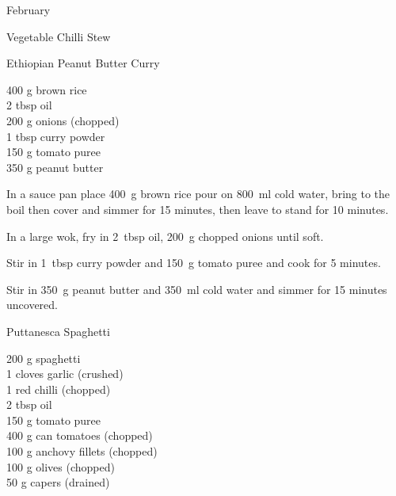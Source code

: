 \begin{menu}{February}
\begin{recipe}{2}{Vegetable Chilli Stew}
\begin{instructions}
    \end{instructions}
    \end{recipe}%
  
    \begin{recipe}{2}{Ethiopian Peanut Butter Curry}%
		\begin{ingredients}
		400 g brown rice  \\
	2 tbsp oil  \\
	200 g onions (chopped) \\
	1 tbsp curry powder  \\
	150 g tomato puree  \\
	350 g peanut butter  \\
	
		\end{ingredients}
	
	
	
    \begin{instructions}
    \item 
    In a
    sauce pan
    place
    400~g  brown rice
    pour on
    800~ml  cold water,
    bring to the boil then cover and simmer for 15 minutes,
    then leave to stand for 10 minutes.
  \item 
        In a large wok,
        fry in 2~tbsp  oil,
        200~g chopped onions
        until soft.
      \item 
        Stir in
        1~tbsp  curry powder
        and
        150~g  tomato puree
        and cook for 5 minutes.
      \item 
        Stir in
        350~g  peanut butter
        and
        350~ml  cold water
        and simmer for 15 minutes uncovered.
      
    \end{instructions}
    \end{recipe}%
  
    \begin{recipe}{1}{Puttanesca Spaghetti}%
		\begin{ingredients}
		200 g spaghetti  \\
	1 cloves garlic (crushed) \\
	1  red chilli (chopped) \\
	2 tbsp oil  \\
	150 g tomato puree  \\
	400 g can tomatoes (chopped) \\
	100 g anchovy fillets (chopped) \\
	100 g olives (chopped) \\
	50 g capers (drained) \\
	

\end{ingredients}
\end{recipe}
\end{menu}
